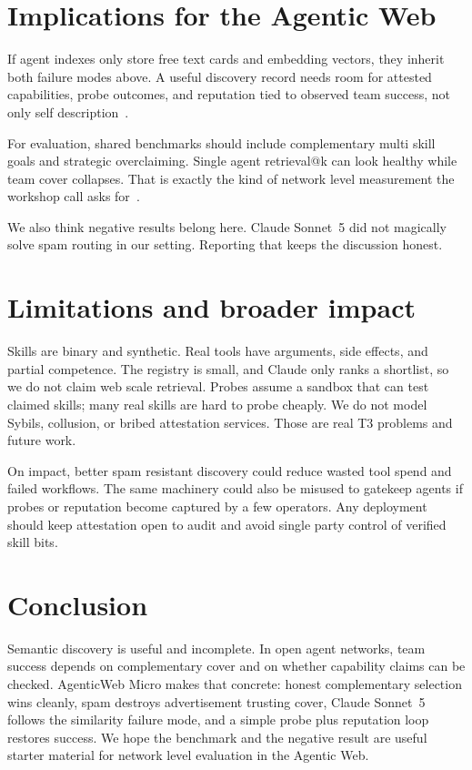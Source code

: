 \documentclass{article}
\begin{document}
\section{Implications for the Agentic Web}

If agent indexes only store free text cards and embedding vectors, they inherit both failure modes above.
A useful discovery record needs room for attested capabilities, probe outcomes, and reputation tied to observed team success, not only self description~\citep{balija2025,raskar2025}.

For evaluation, shared benchmarks should include complementary multi skill goals and strategic overclaiming.
Single agent retrieval@k can look healthy while team cover collapses.
That is exactly the kind of network level measurement the workshop call asks for~\citep{projectnanda2026}.

We also think negative results belong here.
Claude Sonnet~5 did not magically solve spam routing in our setting.
Reporting that keeps the discussion honest.

\section{Limitations and broader impact}

Skills are binary and synthetic.
Real tools have arguments, side effects, and partial competence.
The registry is small, and Claude only ranks a shortlist, so we do not claim web scale retrieval.
Probes assume a sandbox that can test claimed skills; many real skills are hard to probe cheaply.
We do not model Sybils, collusion, or bribed attestation services.
Those are real T3 problems and future work.

On impact, better spam resistant discovery could reduce wasted tool spend and failed workflows.
The same machinery could also be misused to gatekeep agents if probes or reputation become captured by a few operators.
Any deployment should keep attestation open to audit and avoid single party control of verified skill bits.

\section{Conclusion}

Semantic discovery is useful and incomplete.
In open agent networks, team success depends on complementary cover and on whether capability claims can be checked.
AgenticWeb Micro makes that concrete: honest complementary selection wins cleanly, spam destroys advertisement trusting cover, Claude Sonnet~5 follows the similarity failure mode, and a simple probe plus reputation loop restores success.
We hope the benchmark and the negative result are useful starter material for network level evaluation in the Agentic Web.
\end{document}
